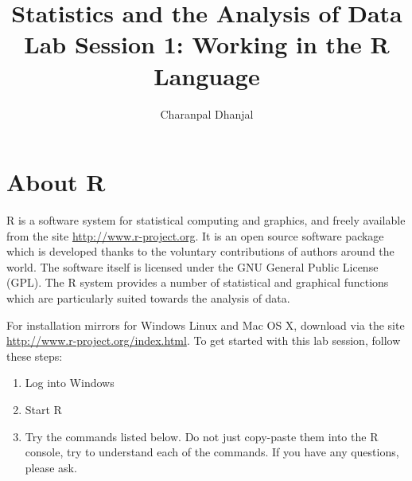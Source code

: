 \documentclass[a4paper,10pt]{article}
\title{Statistics and the Analysis of Data\\ Lab Session 1: Working in the R Language}
\author{Charanpal Dhanjal}
\begin{document}
\maketitle

\section{About R}

R is a software system for statistical computing and graphics, and  freely available from the site \url{http://www.r-project.org}. It is an open source software package which is developed thanks to the voluntary contributions of authors around the world. The software itself is licensed under the GNU General Public License (GPL). The R system provides a number of statistical and graphical functions which are particularly suited towards the analysis of data. 

For installation mirrors for Windows Linux and Mac OS X, download via the site \url{http://www.r-project.org/index.html}. To get started with this lab session, follow these steps: 
\begin{enumerate}
 \item Log into Windows 
 \item Start R 
 \item Try the commands listed below. Do not just copy-paste them into the R console, try to understand each of the commands. If you have any questions, please ask. 
\end{enumerate}
\end{document}
